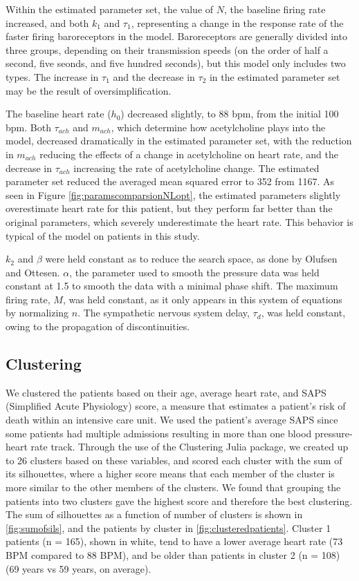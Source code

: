 \documentclass[fleqn,10pt]{wlscirep}
\begin{document}
Within the estimated parameter set, the value of $N$, the baseline firing rate increased, and both $k_1$ and $\tau_1$, representing a change in the response rate of the faster firing baroreceptors in the model. Baroreceptors are generally divided into three groups, depending on their transmission speeds (on the order of half a second, five seonds, and five hundred seconds), but this model only includes two types. \cite{ottesen1996non} The increase in $\tau_1$ and the decrease in $\tau_2$ in the estimated parameter set may be the result of oversimplification. 

The baseline heart rate ($h_0$) decreased slightly, to 88 bpm, from the initial 100 bpm. Both $\tau_{ach}$ and $m_{ach}$, which determine how acetylcholine plays into the model, decreased dramatically in the estimated parameter set, with the reduction in $m_{ach}$ reducing the effects of a change in acetylcholine on heart rate, and the decrease in $\tau_{ach}$ increasing the rate of acetylcholine change. The estimated parameter set reduced the averaged mean squared error to 352 from 1167. As seen in Figure \ref{fig:paramscomparsionNLopt}, the estimated parameters slightly overestimate heart rate for this patient, but they perform far better than the original parameters, which severely underestimate the heart rate. This behavior is typical of the model on patients in this study.

$k_2$ and $\beta$ were held constant as to reduce the search space, as done by Olufsen and Ottesen. $\alpha$, the parameter used to smooth the pressure data was held constant at 1.5 to smooth the data with a minimal phase shift. The maximum firing rate, $M$, was held constant, as it only appears in this system of equations by normalizing $n$. The sympathetic nervous system delay, $\tau_d$, was held constant, owing to the propagation of discontinuities. \cite{baker1997pitfalls}


\subsection*{Clustering}
We clustered the patients based on their age, average heart rate, and SAPS (Simplified Acute Physiology) score, a measure that estimates a patient's risk of death within an intensive care unit.\cite{le1993new} We used the patient's average SAPS since some patients had multiple admissions resulting in more than one blood pressure-heart rate track. 
Through the use of the Clustering Julia package, we created up to 26 clusters based on these variables, and scored each cluster with the sum of its silhouettes, where a higher score means that each member of the cluster is more similar to the other members of the clusters.\cite{rousseeuw1987silhouettes} We found that grouping the patients into two clusters gave the highest score and therefore the best clustering. The sum of silhouettes as a function of number of clusters is shown in \ref{fig:sumofsils}, and the patients by cluster in \ref{fig:clusteredpatients}. Cluster 1 patients (n = 165), shown in white, tend to have a lower average heart rate (73 BPM compared to 88 BPM), and be older than patients in cluster 2 (n = 108) (69 years vs 59 years, on average). 
\end{document}

